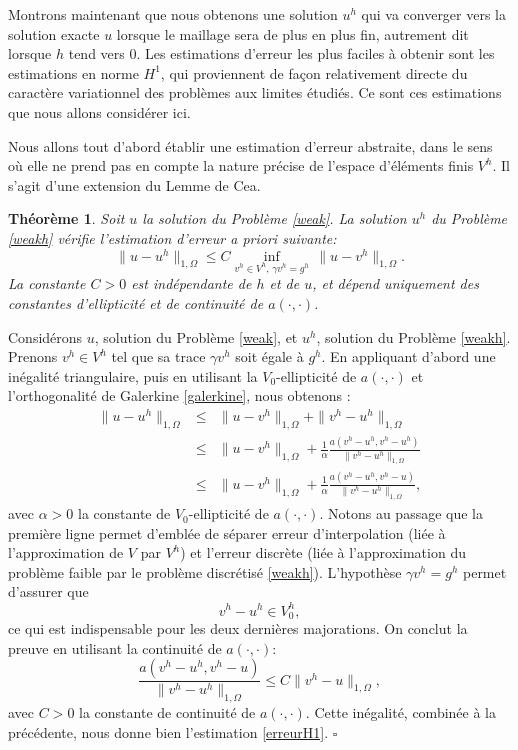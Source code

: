 \documentclass[11pt]{book}
\newtheorem{theorem}{Théorème}[section]
\newcommand{\be}{\begin{equation}}
\newcommand{\ee}{\end{equation}}
\newcommand{\bt}{\begin{theorem}}
\newcommand{\et}{\end{theorem}}
\newcommand{\cqfd}{{$\mbox{}$\hfill$\square$}}
\begin{document}
Montrons maintenant que nous obtenons une solution $u^h$ qui va converger vers la solution exacte $u$ lorsque le maillage sera de plus en plus fin, autrement dit lorsque $h$ tend vers $0$. Les estimations d'erreur les plus faciles à obtenir sont les estimations en norme $H^1$, qui proviennent de façon relativement directe du caractère variationnel des problèmes aux limites étudiés. Ce sont ces estimations que nous allons considérer ici.

Nous allons tout d'abord établir une estimation d'erreur abstraite, dans le sens où elle ne prend pas en compte la nature précise de l'espace d'éléments finis $V^h$. 
Il s'agit d'une extension du Lemme de Cea. %

\bt \label{thm:estimH1} Soit $u$ la solution du Problème \eqref{weak}. La solution $u^h$ du Problème \eqref{weakh} vérifie l'estimation d'erreur \emph{a priori} suivante:
\be \label{erreurH1}
 \| u - u^h \|_{1,\Omega} \leq C \inf_{v^h \in V^h, \, \gamma v^h = g^h} \, \| u - v^h \|_{1,\Omega}.
\ee
La constante $C>0$ est indépendante de $h$ et de $u$, et dépend uniquement des constantes d'ellipticité et de continuité de $a(\cdot,\cdot)$.
\et

\proof Considérons $u$, solution du Problème \eqref{weak}, et $u^h$, solution du Problème \eqref{weakh}. Prenons $v^h \in V^h$ tel que sa trace $\gamma v^h$ soit égale à $g^h$. En appliquant d'abord une inégalité triangulaire, puis en utilisant la $V_0$-ellipticité de $a(\cdot,\cdot)$ et l'orthogonalité de Galerkine \eqref{galerkine}, nous obtenons :
 \begin{eqnarray*}
  \| u - u^h \|_{1,\Omega} & \leq & \| u - v^h \|_{1,\Omega} + \| v^h - u^h \|_{1,\Omega} \\
  & \leq & \| u - v^h \|_{1,\Omega} + \frac1\alpha \frac{a( v^h - u^h , v^h - u^h )}{\| v^h - u^h \|_{1,\Omega}} \\
  & \leq & \| u - v^h \|_{1,\Omega} + \frac1\alpha \frac{a( v^h - u^h , v^h - u )}{\| v^h - u^h \|_{1,\Omega}},
 \end{eqnarray*}
avec $\alpha > 0$ la constante de $V_0$-ellipticité de $a(\cdot,\cdot)$. Notons au passage que la première ligne permet d'emblée de séparer erreur d'interpolation (liée à l'approximation de $V$ par $V^h$) et l'erreur discrète (liée à l'approximation du problème faible par le problème discrétisé \eqref{weakh}). L'hypothèse $\gamma v^h = g^h$ permet d'assurer que 
\[
v^h - u^h \in V^h_0,
\]
ce qui est indispensable pour les deux dernières majorations.
On conclut la preuve en utilisant la continuité de $a(\cdot,\cdot)$:
\[
\frac{a( v^h - u^h , v^h - u )}{\| v^h - u^h \|_{1,\Omega}} \leq C \| v^h - u \|_{1,\Omega},
\]
avec $C>0$ la constante de continuité de $a(\cdot,\cdot)$.
Cette inégalité, combinée à la précédente, nous donne bien l'estimation \eqref{erreurH1}.
\cqfd 
\end{document}

